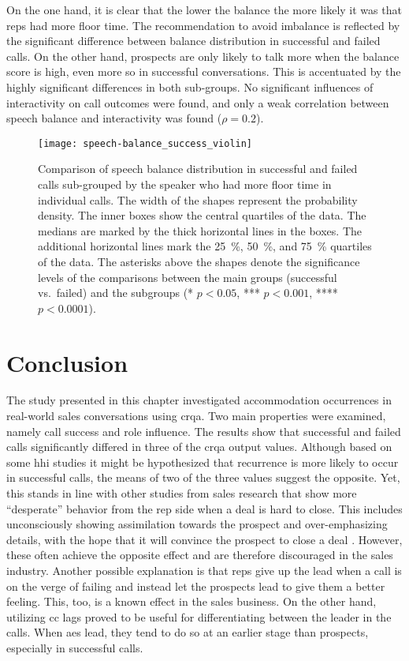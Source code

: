 On the one hand, it is clear that the lower the balance the more likely it was that reps had more floor time.
The recommendation to avoid imbalance is reflected by the significant difference between balance distribution in successful and failed calls.
On the other hand, prospects are only likely to talk more when the balance score is high, even more so in successful conversations.
This is accentuated by the highly significant differences in both sub-groups.
No significant influences of interactivity on call outcomes were found, and only a weak correlation between speech balance and interactivity was found ($\rho = 0.2$).
%
\begin{figure}
	\centering
	\texttt{[image: speech-balance\_success\_violin]}
	\caption[Distribution of speech balance in successful and failed calls]
		{Comparison of speech balance distribution in successful and failed calls sub-grouped by the speaker who had more floor time in individual calls.
		The width of the shapes represent the probability density.
		The inner boxes show the central quartiles of the data.
		The medians are marked by the thick horizontal lines in the boxes.
		The additional horizontal lines mark the \SI{25}{\percent}, \SI{50}{\percent}, and \SI{75}{\percent} quartiles of the data.
		The asterisks above the shapes denote the significance levels of the comparisons between the main groups (successful vs.\ failed) and the subgroups (* $p < 0.05$, *** $p < 0.001$, **** $p < 0.0001$).}
	\label{fig:speech-balance_success_violin}
\end{figure}

\section{Conclusion}
\label{sec:conclusion_hhi}

The study presented in this chapter investigated accommodation occurrences in real-world sales conversations using \acf{crqa}.
Two main properties were examined, namely call success and role influence.
The results show that successful and failed calls significantly differed in three of the \ac{crqa} output values.
Although based on some \ac{hhi} studies it might be hypothesized that recurrence is more likely to occur in successful calls, the means of two of the three values suggest the opposite.
Yet, this stands in line with other studies from sales research that show more \enquote{desperate} behavior from the rep side when a deal is hard to close.
This includes unconsciously showing assimilation towards the prospect and over-emphasizing details, with the hope that it will convince the prospect to close a deal \citep{Orlob2018roi}.
However, these often achieve the opposite effect and are therefore discouraged in the sales industry.
Another possible explanation is that reps give up the lead when a call is on the verge of failing and instead let the prospects lead to give them a better feeling.
This, too, is a known effect in the sales business.
On the other hand, utilizing \acl{cc} lags proved to be useful for differentiating between the leader in the calls.
When \acfp{ae} lead, they tend to do so at an earlier stage than prospects, especially in successful calls.

